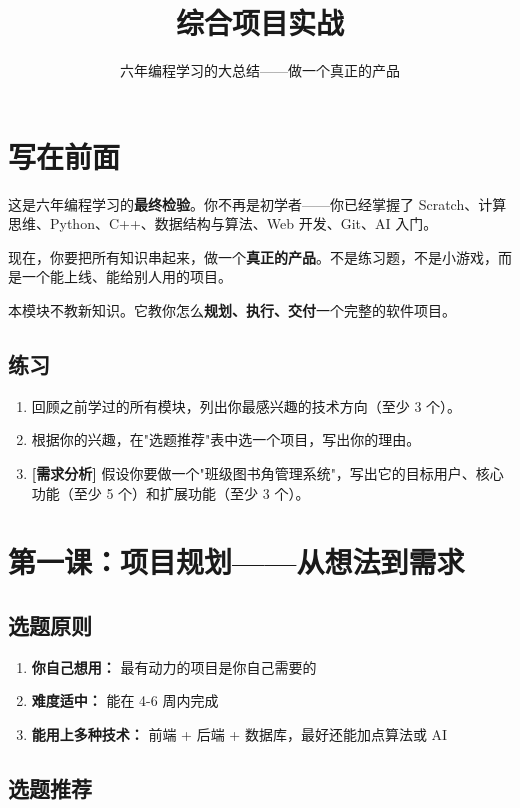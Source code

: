 \documentclass[a4paper,12pt]{ctexart}
\title{\textcolor{blue!70!black}{\Huge\textbf{综合项目实战}}}
\author{六年编程学习的大总结——做一个真正的产品}
\date{}
\begin{document}
\maketitle
\thispagestyle{empty}

\section*{写在前面}

这是六年编程学习的\textbf{最终检验}。你不再是初学者——你已经掌握了 Scratch、计算思维、Python、C++、数据结构与算法、Web 开发、Git、AI 入门。

现在，你要把所有知识串起来，做一个\textbf{真正的产品}。不是练习题，不是小游戏，而是一个能上线、能给别人用的项目。

本模块不教新知识。它教你怎么\textbf{规划、执行、交付}一个完整的软件项目。

\subsection*{练习}

\begin{enumerate}
  \item 回顾之前学过的所有模块，列出你最感兴趣的技术方向（至少 3 个）。
  \item 根据你的兴趣，在"选题推荐"表中选一个项目，写出你的理由。
  \item \textbf{[需求分析]} 假设你要做一个"班级图书角管理系统"，写出它的目标用户、核心功能（至少 5 个）和扩展功能（至少 3 个）。
\end{enumerate}

\section*{第一课：项目规划——从想法到需求}

\subsection*{选题原则}

\begin{enumerate}
  \item \textbf{你自己想用：} 最有动力的项目是你自己需要的
  \item \textbf{难度适中：} 能在 4-6 周内完成
  \item \textbf{能用上多种技术：} 前端 + 后端 + 数据库，最好还能加点算法或 AI
\end{enumerate}

\subsection*{选题推荐}
\end{document}
